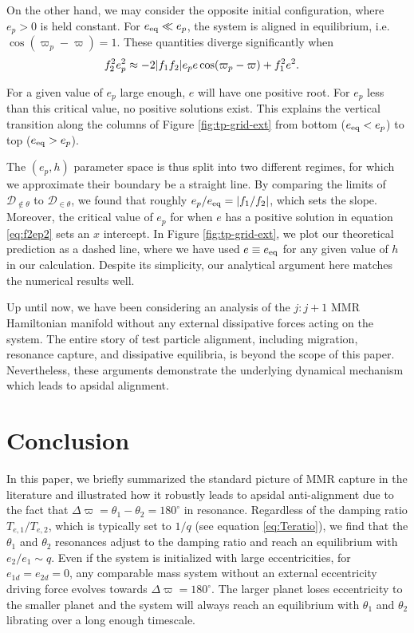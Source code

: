 \documentclass[usenatbib,onecolumn]{mnras}
\DeclarePairedDelimiter{\abs}{|}{|}
\begin{document}
On the other hand, we may consider the opposite initial configuration,
where \(e_p>0\) is held constant.  For \(e_{\rm eq} \ll e_p\), the system
is aligned in equilibrium, i.e. \(\cos(\varpi_p-\varpi)=1\).  These
quantities diverge significantly when
\begin{align}
\label{eq:f2ep2}
f_2^2e_p^2 &\approx -2\abs{f_1f_2}e_p e\cos(\varpi_p-\varpi) + f_1^2e^2.
\end{align}

\noindent For a given value of \(e_p\) large enough, \(e\) will
have one positive root. For \(e_p\) less than this critical value, no
positive solutions exist.  This explains the vertical transition along
the columns of Figure \ref{fig:tp-grid-ext} from bottom (\(e_{\rm eq}<
e_p\)) to top (\(e_{\rm eq} >e_p\)).

The \((e_p,h)\) parameter space is thus split into two different
regimes, for which we approximate their boundary be a straight line.
By comparing the limits of \(\mathcal D_{\notin\theta}\) to \(\mathcal
D_{\in\theta}\), we found that roughly \(e_{p}/e_{\rm eq} = |f_1/f_2|\),
which sets the slope. Moreover, the critical value of \(e_p\) for when
\(e\) has a positive solution in equation \eqref{eq:f2ep2} sets an \(x\)
intercept.  In Figure \ref{fig:tp-grid-ext}, we plot our theoretical
prediction as a dashed line, where we have used \(e\equiv e_{\rm eq}\)
for any given value of \(h\) in our calculation. Despite its simplicity,
our analytical argument here matches the numerical results well.

Up until now, we have been considering an analysis of the \(j:j+1\) MMR
Hamiltonian manifold without any external dissipative forces acting on
the system. The entire story of test particle alignment, including
migration, resonance capture, and dissipative equilibria, is beyond
the scope of this paper. Nevertheless, these arguments demonstrate
the underlying dynamical mechanism which leads to apsidal alignment.

\section{Conclusion}
\label{sec:org016813a}
In this paper, we briefly summarized the standard picture of MMR
capture in the literature and illustrated how it robustly leads to
apsidal anti-alignment due to the fact that
\(\Delta\varpi=\theta_1-\theta_2=180^\circ\) in resonance.  Regardless
of the damping ratio \(T_{e,1}/T_{e,2}\), which is typically set to
\(1/q\) (see equation \eqref{eq:Teratio}), we find that the \(\theta_1\) and
\(\theta_2\) resonances adjust to the damping ratio and reach an
equilibrium with \(e_2/e_1\sim q\).  Even if the system is initialized
with large eccentricities, for \(e_{1d}=e_{2d}=0\), any comparable mass
system without an external eccentricity driving force evolves towards
\(\Delta\varpi=180^\circ\). The larger planet loses eccentricity to the
smaller planet and the system will always reach an equilibrium with
\(\theta_1\) and \(\theta_2\) librating over a long enough timescale.
\end{document}
